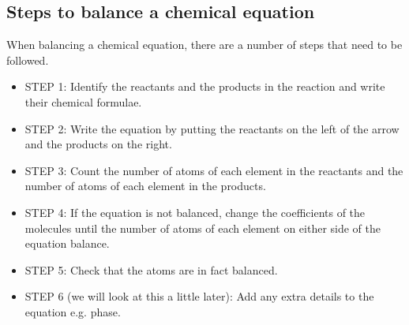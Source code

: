             \subsection*{Steps to balance a chemical equation}
            \nopagebreak
        \label{m38726*id63708}When balancing a chemical equation, there are a number of steps that need to be followed.\par 
        \label{m38726*id63712}\begin{itemize}[noitemsep]
            \label{m38726*uid11}\item STEP 1: Identify the reactants and the products in the reaction and write their chemical formulae.
\label{m38726*uid12}\item STEP 2: Write the equation by putting the reactants on the left of the arrow and the products on the right.
\label{m38726*uid13}\item STEP 3: Count the number of atoms of each element in the reactants and the number of atoms of each element in the products.
\label{m38726*uid14}\item STEP 4: If the equation is not balanced, change the coefficients of the molecules until the number of atoms of each element on either side of the equation balance.
\label{m38726*uid15}\item STEP 5: Check that the atoms are in fact balanced.
\label{m38726*uid16}\item STEP 6 (we will look at this a little later): Add any extra details to the equation e.g. phase.
\end{itemize}
\par
            \label{m38726*secfhsst!!!underscore!!!id296}\vspace{.5cm} 
      \noindent
